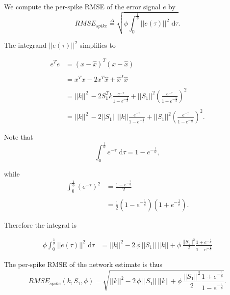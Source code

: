 \begin{enumerate}
We compute the per-spike RMSE of the error signal  $e$ by 
\begin{equation}
\label{eq:per_spike_rmse_def}
RMSE_{spike} \overset{\Delta}{=} \sqrt{\phi \int_{0}^{\frac{1}{\phi}} \!  ||e(\tau)||^2 \, \, \mathrm{d}\tau}.
\end{equation}

The integrand $||e(\tau)||^2$ simplifies to 

\begin{align*}
e^T e &= (x - \hat{x})^T (x - \hat{x}) \\
\\
&= x^T x - 2 x^T \hat{x} + \hat{x}^T \hat{x} \\
\\
&= ||k||^2 \, - 2 S_1^T k \frac{e^{- \tau}}{1 - e^{-\frac{1}{\phi}}} 
+ 
||S_1||^2  \left(\frac{e^{- \tau}}{1 - e^{-\frac{1}{\phi}}} \right)^2\\
\\
&= ||k||^2 \, - 2 ||S_1|| \,  ||k|| \frac{e^{- \tau}}{1 - e^{-\frac{1}{\phi}}} 
+ 
||S_1||^2  \left(\frac{e^{- \tau}}{1 - e^{-\frac{1}{\phi}}} \right)^2.
\end{align*}

Note that
$$
\int_{0}^{\frac{1}{\phi}} \! e^{-\tau} \, \, \mathrm{d}\tau 
=
1-e^{-\frac{1}{\phi}},
$$

while 
\begin{align*}
\int_{0}^{\frac{1}{\phi}} \! \left(e^{-\tau}\right)^2
&=
\frac
{
	1 - e^{-\frac{2}{\phi}}
}
{2}
\\
\\
&= 
\frac{1}{2}\left(1 - e^{-\frac{1}{\phi}}\right)\left(1 + e^{-\frac{1}{\phi}}\right).
\end{align*}

Therefore the integral is

\begin{align*}
\phi\int_{0}^{\frac{1}{\phi}} \!  ||e(\tau)||^2 \, \, \mathrm{d}\tau &= 
||k||^2 -
   2\, \phi  \, ||S_1|| \, ||k|| 
   +
   \phi \,
   \frac{||S_1||^2}{2} 
	\frac{1+e^{-\frac{1}{\phi} }}{1-e^{-\frac{1}{\phi} }}
\end{align*}


The per-spike RMSE of the network estimate is thus
\begin{equation}
RMSE_{spike}(k, S_1, \phi) =
\sqrt
{
	||k||^2 -
	   2\, \phi  \, ||S_1|| \, ||k|| 
	   +
	   \phi \,   \frac{||S_1||^2}{2} 
	\frac{1+e^{-\frac{1}{\phi} }}{1-e^{-\frac{1}{\phi} }}
}.
\end{equation}


\end{enumerate}
